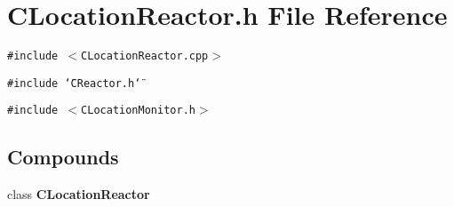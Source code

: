 \section{CLocation\-Reactor.h File Reference}
\label{CLocationReactor_8h}
{\tt \#include $<$CLocation\-Reactor.cpp$>$}\par
{\tt \#include \char`\"{}CReactor.h\char`\"{}}\par
{\tt \#include $<$CLocation\-Monitor.h$>$}\par
\subsection*{Compounds}
\begin{CompactItemize}
\item 
class {\bf CLocation\-Reactor}
\end{CompactItemize}
